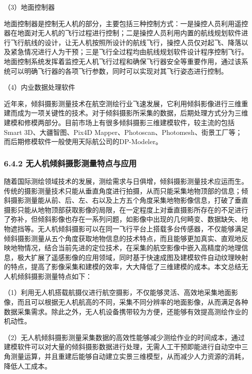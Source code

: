 （3）地面控制器

地面控制器是控制无人机的部分，主要包括三种控制方式：一是操控人员利用遥控器在地面对无人机的飞行过程进行控制；二是操控人员利用内置的航线规划软件进行飞行航线的设计，让无人机按照所设计的航线飞行，操控人员仅对起飞、降落以及紧急情况进行人为干预；三是飞行全过程均由航线规划软件设计程序控制飞行。地面控制系统发挥着监控无人机飞行过程和确保飞行器安全等重要作用，通过该系统可以明确飞行器的各项飞行参数，同时可以实现对其飞行姿态进行控制。

（4）内业数据处理软件

近年来，倾斜摄影测量技术在航空测绘行业飞速发展，它利用倾斜影像进行三维重建而成为一项关键性的技术。对于倾斜摄影所采集的数据，后期处理方式分为三维建模和修模两部分。目前市场上有很多倾斜摄影三维建模软件，较主流的包括Smart 3D、大疆智图、Pix4D Mapper、Photoscan、Photomesh、街景工厂等；而后期修模软件一般使用天际航公司的DP-Modeler。

\hypertarget{ux65e0ux4ebaux673aux503eux659cux6444ux5f71ux6d4bux91cfux7279ux70b9ux4e0eux5e94ux7528}{%
\subsubsection{6.4.2 无人机倾斜摄影测量特点与应用}\label{ux65e0ux4ebaux673aux503eux659cux6444ux5f71ux6d4bux91cfux7279ux70b9ux4e0eux5e94ux7528}}

随着国际测绘领域技术的发展，测绘需求与日俱增，倾斜摄影测量技术应运而生。传统的摄影测量技术只能从垂直角度进行拍摄，从而只能采集地物顶部的信息；倾斜摄影测量能从前、后、左、右以及上方五个角度采集地物影像信息，打破了垂直摄影只能从地物顶部获取影像的局限，在一定程度上对垂直摄影所存在的不足进行了弥补，但倾斜影像也存在一系列问题，如影像中出现的几何畸变、数据缺失、地物遮挡等。无人机倾斜摄影可以在同一飞行平台上搭载多台传感器，不仅能够满足倾斜摄影测量从五个角度获取地物信息的技术特点，而且能够更加真实、直观地反映地物情况，结合当前先进的定位技术，在采集的航空影像中嵌入高精度的地理信息，极大扩展了遥感影像的应用领域，同时基于快速成图及建模软件自动纹理映射的特点，提高了影像采集和建模的效率，大大降低了三维建模的成本。本文总结无人机倾斜摄影测量特点如下：

（1）利用无人机搭载航摄仪进行航空摄影，不仅能够灵活、高效地采集地面影像，而且可以根据无人机航高的不同，采集不同分辨率的地面影像，从而满足各种数据采集需求。除此之外，无人机设备携带较为方便，还能够有效提高测绘作业的机动性。

（2）无人机倾斜摄影测量采集数据的高效性能够减少测绘作业的时间成本，通过建模软件可以对大量的倾斜摄影数据进行处理，无需人工干预即能进行自动空中三角测量运算，并且重建后能够自动建立实景三维模型，从而减少人力资源的消耗，降低人工成本。

